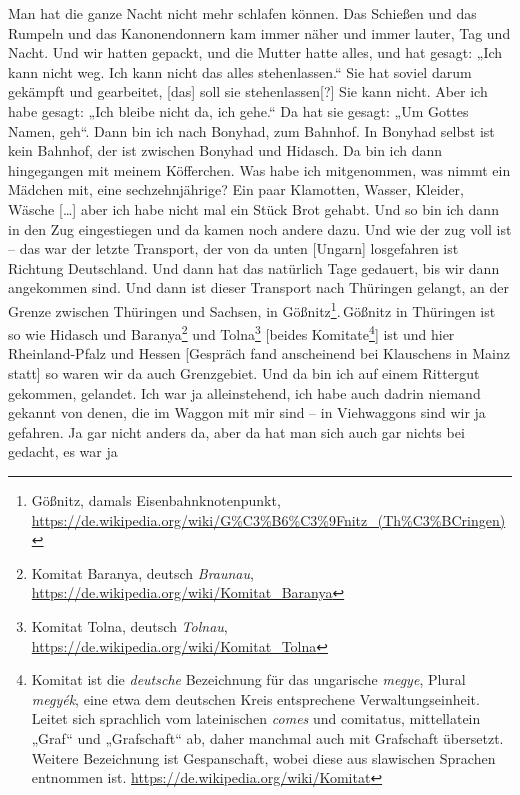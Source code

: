 \documentclass[ngerman,]{article}
\providecommand{\tightlist}{%
  \setlength{\itemsep}{0pt}\setlength{\parskip}{0pt}}
\begin{document}
\begin{multicols}{2}
\begin{description}
\tightlist
\item[Käthe]
Man hat die ganze Nacht nicht mehr schlafen können. Das Schießen und das
Rumpeln und das Kanonendonnern kam immer näher und immer lauter, Tag und
Nacht. Und wir hatten gepackt, und die Mutter hatte alles, und hat
gesagt: „Ich kann nicht weg. Ich kann nicht das alles stehenlassen.“ Sie
hat soviel darum gekämpft und gearbeitet, {[}das{]} soll sie
stehenlassen{[}?{]} Sie kann nicht. Aber ich habe gesagt: „Ich bleibe
nicht da, ich gehe.“ Da hat sie gesagt: „Um Gottes Namen, geh“. Dann bin
ich nach Bonyhad, zum Bahnhof. In Bonyhad selbst ist kein Bahnhof, der
ist zwischen Bonyhad und Hidasch. Da bin ich dann hingegangen mit meinem
Köfferchen. Was habe ich mitgenommen, was nimmt ein Mädchen mit, eine
sechzehnjährige? Ein paar Klamotten, Wasser, Kleider, Wäsche
{[}\ldots{}{]} aber ich habe nicht mal ein Stück Brot gehabt. Und so bin
ich dann in den Zug eingestiegen und da kamen noch andere dazu. Und wie
der zug voll ist – das war der letzte Transport, der von da unten
{[}Ungarn{]} losgefahren ist Richtung Deutschland. Und dann hat das
natürlich Tage gedauert, bis wir dann angekommen sind. Und dann ist
dieser Transport nach Thüringen gelangt, an der Grenze zwischen
Thüringen und Sachsen, in Gößnitz\footnote{Gößnitz, damals
  Eisenbahnknotenpunkt,
  \url{https://de.wikipedia.org/wiki/G\%C3\%B6\%C3\%9Fnitz_(Th\%C3\%BCringen)}}.\,Gößnitz
in Thüringen ist so wie Hidasch und Baranya\footnote{Komitat Baranya,
  deutsch \emph{Braunau},
  \url{https://de.wikipedia.org/wiki/Komitat_Baranya}} und
Tolna\footnote{Komitat Tolna, deutsch \emph{Tolnau},
  \url{https://de.wikipedia.org/wiki/Komitat_Tolna}} {[}beides
Komitate\footnote{Komitat ist die \emph{deutsche} Bezeichnung für das
  ungarische \emph{megye}, Plural \emph{megyék}, eine etwa dem deutschen
  Kreis entsprechene Verwaltungseinheit. Leitet sich sprachlich vom
  lateinischen \emph{comes} und comitatus, mittellatein „Graf“ und
  „Grafschaft“ ab, daher manchmal auch mit Grafschaft übersetzt. Weitere
  Bezeichnung ist Gespanschaft, wobei diese aus slawischen Sprachen
  entnommen ist. \url{https://de.wikipedia.org/wiki/Komitat}}{]} ist und
hier Rheinland-Pfalz und Hessen {[}Gespräch fand anscheinend bei
Klauschens in Mainz statt{]} so waren wir da auch Grenzgebiet. Und da
bin ich auf einem Rittergut gekommen, gelandet. Ich war ja
alleinstehend, ich habe auch dadrin niemand gekannt von denen, die im
Waggon mit mir sind – in Viehwaggons sind wir ja gefahren. Ja gar nicht
anders da, aber da hat man sich auch gar nichts bei gedacht, es war ja

\end{description}
\end{multicols}
\end{document}
